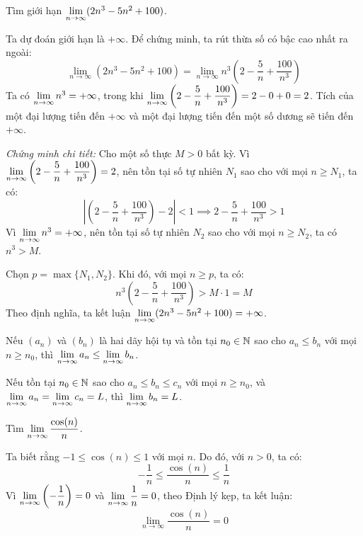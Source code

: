 \begin{example}
Tìm giới hạn $\lim\limits_{n \to \infty} (2n^3 - 5n^2 + 100)$.
\begin{solution}
Ta dự đoán giới hạn là $+\infty$. Để chứng minh, ta rút thừa số có bậc cao nhất ra ngoài:
\[ \lim_{n \to \infty} (2n^3 - 5n^2 + 100) = \lim_{n \to \infty} n^3 \left(2 - \dfrac{5}{n} + \dfrac{100}{n^3}\right) \]
Ta có $\lim\limits_{n \to \infty} n^3 = +\infty$, trong khi $\lim\limits_{n \to \infty} \left(2 - \dfrac{5}{n} + \dfrac{100}{n^3}\right) = 2 - 0 + 0 = 2$.
Tích của một đại lượng tiến đến $+\infty$ và một đại lượng tiến đến một số dương sẽ tiến đến $+\infty$.

\textit{Chứng minh chi tiết:}
Cho một số thực $M > 0$ bất kỳ.
Vì $\lim\limits_{n \to \infty} \left(2 - \dfrac{5}{n} + \dfrac{100}{n^3}\right) = 2$, nên tồn tại số tự nhiên $N_1$ sao cho với mọi $n \ge N_1$, ta có:
\[ \left| \left(2 - \dfrac{5}{n} + \dfrac{100}{n^3}\right) - 2 \right| < 1 \implies 2 - \dfrac{5}{n} + \dfrac{100}{n^3} > 1 \]
Vì $\lim\limits_{n \to \infty} n^3 = +\infty$, nên tồn tại số tự nhiên $N_2$ sao cho với mọi $n \ge N_2$, ta có $n^3 > M$.

Chọn $p = \max\{N_1, N_2\}$. Khi đó, với mọi $n \ge p$, ta có:
\[ n^3 \left(2 - \dfrac{5}{n} + \dfrac{100}{n^3}\right) > M \cdot 1 = M \]
Theo định nghĩa, ta kết luận $\lim\limits_{n \to \infty} (2n^3 - 5n^2 + 100) = +\infty$.
\end{solution}
\end{example}

\begin{theorem}
Nếu $(a_n)$ và $(b_n)$ là hai dãy hội tụ và tồn tại $n_0 \in \mathbb{N}$ sao cho $a_n \le b_n$ với mọi $n \ge n_0$, thì $\lim\limits_{n \to \infty} a_n \le \lim\limits_{n \to \infty} b_n$.
\end{theorem}

\begin{corollary}
Nếu tồn tại $n_0 \in \mathbb{N}$ sao cho $a_n \le b_n \le c_n$ với mọi $n \ge n_0$, và $\lim\limits_{n \to \infty} a_n = \lim\limits_{n \to \infty} c_n = L$, thì $\lim\limits_{n \to \infty} b_n = L$.
\end{corollary}

\begin{example}
Tìm $\lim\limits_{n \to \infty} \dfrac{\cos(n)}{n}$.
\begin{solution}
Ta biết rằng $-1 \le \cos(n) \le 1$ với mọi $n$. Do đó, với $n > 0$, ta có:
\[ -\dfrac{1}{n} \le \dfrac{\cos(n)}{n} \le \dfrac{1}{n} \]
Vì $\lim\limits_{n \to \infty} \left(-\dfrac{1}{n}\right) = 0$ và $\lim\limits_{n \to \infty} \dfrac{1}{n} = 0$, theo Định lý kẹp, ta kết luận:
\[ \lim_{n \to \infty} \dfrac{\cos(n)}{n} = 0 \]
\end{solution}
\end{example}

